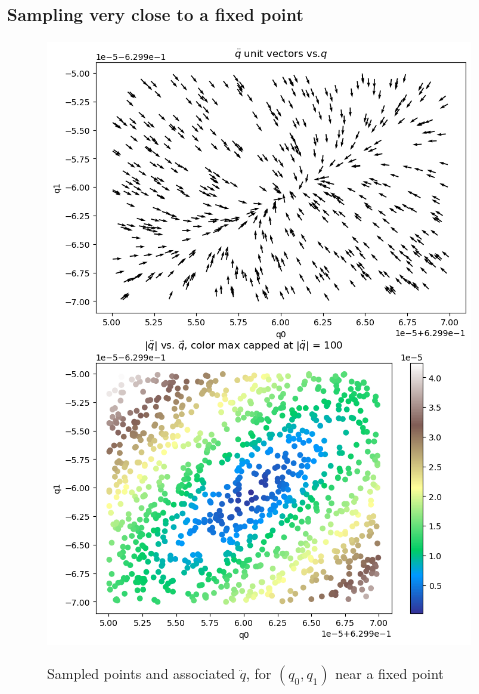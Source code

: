 \documentclass[]{article}
\begin{document}
\begin{appendices}
\subsubsection{Sampling very close to a fixed point}

\begin{figure}[H]
	\caption{Sampled points and associated $\ddot{q}$, for $(q_0,q_1)$ near a fixed point}
	\centering
	\includegraphics[scale=0.40]{2D-sampling-fixed-point-close.png}
	\label{fig:2D-sampling-fixed-point-close}
\end{figure}


\end{appendices}
\end{document}
